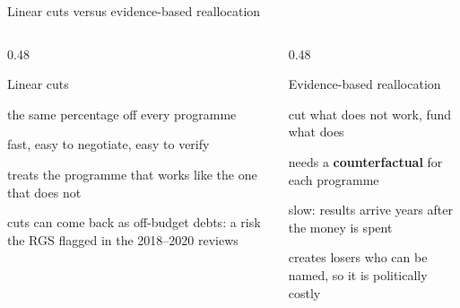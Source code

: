 \documentclass[aspectratio=169,xcolor=table]{beamer}
\begin{document}
\begin{frame}{Linear cuts versus evidence-based reallocation}
\footnotesize
\begin{columns}[T]
\begin{column}{0.48\textwidth}
\begin{alertblock}{Linear cuts}
\bi
  \item the same percentage off every programme
  \item fast, easy to negotiate, easy to verify
  \item treats the programme that works like the one that does not
  \item cuts can come back as off-budget debts: a risk the RGS flagged in the 2018--2020 reviews
\ei
\end{alertblock}
\end{column}
\begin{column}{0.48\textwidth}
\begin{block}{Evidence-based reallocation}
\bi
  \item cut what does not work, fund what does
  \item needs a \textbf{counterfactual} for each programme
  \item slow: results arrive years after the money is spent
  \item creates losers who can be named, so it is politically costly
\ei
\end{block}
\end{column}
\end{columns}
\end{frame}
\end{document}
